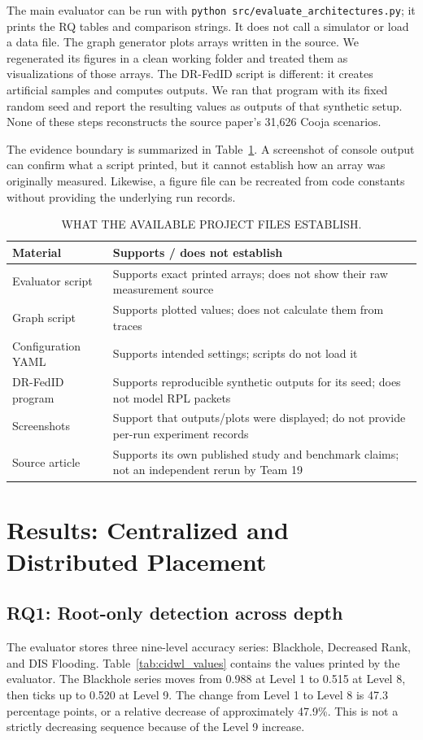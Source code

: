 \documentclass[conference]{IEEEtran}
\begin{document}
The main evaluator can be run with \texttt{python src/evaluate\_architectures.py}; it prints the RQ tables and comparison strings. It does not call a simulator or load a data file. The graph generator plots arrays written in the source. We regenerated its figures in a clean working folder and treated them as visualizations of those arrays. The DR-FedID script is different: it creates artificial samples and computes outputs. We ran that program with its fixed random seed and report the resulting values as outputs of that synthetic setup. None of these steps reconstructs the source paper's 31,626 Cooja scenarios.

The evidence boundary is summarized in Table~\ref{tab:evidence_boundary}. A screenshot of console output can confirm what a script printed, but it cannot establish how an array was originally measured. Likewise, a figure file can be recreated from code constants without providing the underlying run records.

\begin{table}[htbp]
\centering
\caption{WHAT THE AVAILABLE PROJECT FILES ESTABLISH.}
\label{tab:evidence_boundary}
\begin{tabular}{p{2.6cm}p{5.2cm}}
\toprule
\textbf{Material} & \textbf{Supports / does not establish} \\
\midrule
Evaluator script & Supports exact printed arrays; does not show their raw measurement source \\
Graph script & Supports plotted values; does not calculate them from traces \\
Configuration YAML & Supports intended settings; scripts do not load it \\
DR-FedID program & Supports reproducible synthetic outputs for its seed; does not model RPL packets \\
Screenshots & Support that outputs/plots were displayed; do not provide per-run experiment records \\
Source article & Supports its own published study and benchmark claims; not an independent rerun by Team 19 \\
\bottomrule
\end{tabular}
\end{table}

\section{Results: Centralized and Distributed Placement}
\subsection{RQ1: Root-only detection across depth}
The evaluator stores three nine-level accuracy series: Blackhole, Decreased Rank, and DIS Flooding. Table~\ref{tab:cidwl_values} contains the values printed by the evaluator. The Blackhole series moves from 0.988 at Level 1 to 0.515 at Level 8, then ticks up to 0.520 at Level 9. The change from Level 1 to Level 8 is 47.3 percentage points, or a relative decrease of approximately 47.9\%. This is not a strictly decreasing sequence because of the Level 9 increase.
\end{document}
